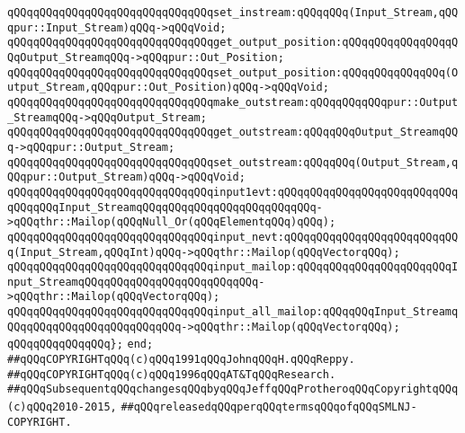\verb|qQQqqQQqqQQqqQQqqQQqqQQqqQQqqQQqset_instream:qQQqqQQq(Input_Stream,qQQqpur::Input_Stream)qQQq->qQQqVoid;|\newline
\newline
\verb|qQQqqQQqqQQqqQQqqQQqqQQqqQQqqQQqget_output_position:qQQqqQQqqQQqqQQqqQQqOutput_StreamqQQq->qQQqpur::Out_Position;|\newline
\verb|qQQqqQQqqQQqqQQqqQQqqQQqqQQqqQQqset_output_position:qQQqqQQqqQQqqQQq(Output_Stream,qQQqpur::Out_Position)qQQq->qQQqVoid;|\newline
\newline
\verb|qQQqqQQqqQQqqQQqqQQqqQQqqQQqqQQqmake_outstream:qQQqqQQqqQQqpur::Output_StreamqQQq->qQQqOutput_Stream;|\newline
\newline
\verb|qQQqqQQqqQQqqQQqqQQqqQQqqQQqqQQqget_outstream:qQQqqQQqOutput_StreamqQQq->qQQqpur::Output_Stream;|\newline
\verb|qQQqqQQqqQQqqQQqqQQqqQQqqQQqqQQqset_outstream:qQQqqQQq(Output_Stream,qQQqpur::Output_Stream)qQQq->qQQqVoid;|\newline
\newline
\verb|qQQqqQQqqQQqqQQqqQQqqQQqqQQqqQQqinput1evt:qQQqqQQqqQQqqQQqqQQqqQQqqQQqqQQqqQQqInput_StreamqQQqqQQqqQQqqQQqqQQqqQQqqQQq->qQQqthr::Mailop(qQQqNull_Or(qQQqElementqQQq)qQQq);|\newline
\verb|qQQqqQQqqQQqqQQqqQQqqQQqqQQqqQQqinput_nevt:qQQqqQQqqQQqqQQqqQQqqQQqqQQq(Input_Stream,qQQqInt)qQQq->qQQqthr::Mailop(qQQqVectorqQQq);|\newline
\verb|qQQqqQQqqQQqqQQqqQQqqQQqqQQqqQQqinput_mailop:qQQqqQQqqQQqqQQqqQQqqQQqInput_StreamqQQqqQQqqQQqqQQqqQQqqQQqqQQq->qQQqthr::Mailop(qQQqVectorqQQq);|\newline
\verb|qQQqqQQqqQQqqQQqqQQqqQQqqQQqqQQqinput_all_mailop:qQQqqQQqInput_StreamqQQqqQQqqQQqqQQqqQQqqQQqqQQq->qQQqthr::Mailop(qQQqVectorqQQq);|\newline
\newline
\verb|qQQqqQQqqQQqqQQq};|\newline
\verb|end;|\newline
\newline
\verb|##qQQqCOPYRIGHTqQQq(c)qQQq1991qQQqJohnqQQqH.qQQqReppy.|\newline
\verb|##qQQqCOPYRIGHTqQQq(c)qQQq1996qQQqAT&TqQQqResearch.|\newline
\verb|##qQQqSubsequentqQQqchangesqQQqbyqQQqJeffqQQqProtheroqQQqCopyrightqQQq(c)qQQq2010-2015,|\newline
\verb|##qQQqreleasedqQQqperqQQqtermsqQQqofqQQqSMLNJ-COPYRIGHT.|\newline

